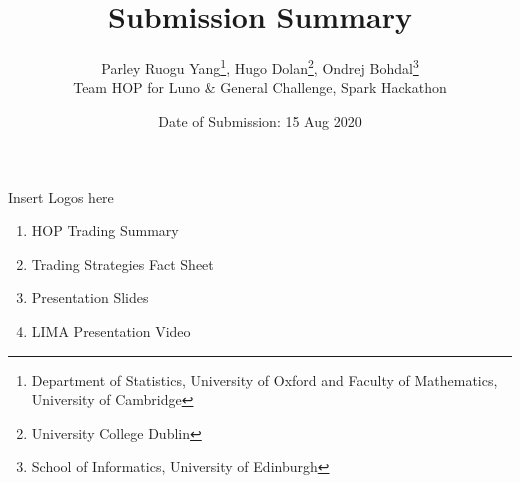 \documentclass[12pt,a4paper]{article}
\author{Parley Ruogu Yang\footnote{Department of Statistics, University of Oxford and Faculty of Mathematics, University of Cambridge}, Hugo Dolan\footnote{University College Dublin}, Ondrej Bohdal\footnote{School of Informatics, University of Edinburgh} \\ Team HOP for Luno \& General Challenge, Spark Hackathon }
\title{Submission Summary}
\date{Date of Submission: 15 Aug 2020}
\begin{document}
\maketitle
\vfill
Insert  Logos here

\vfill
\begin{enumerate}
	\item HOP Trading Summary
	\item Trading Strategies Fact Sheet
	\item Presentation Slides
	\item LIMA Presentation Video
\end{enumerate}

\vfill

\thispagestyle{empty}
\end{document}
